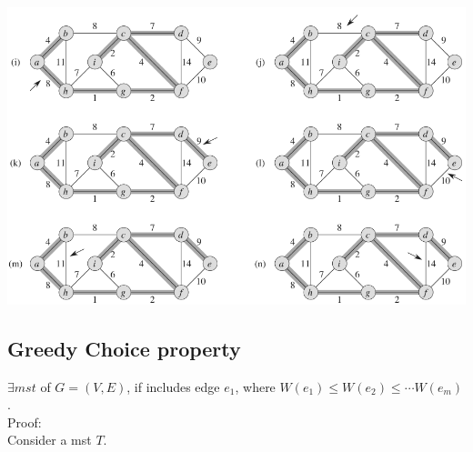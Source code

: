 \documentclass[a4paper]{article}
\begin{document}
\includegraphics[width=\textwidth]{Kruskal2}
\subsection*{Greedy Choice property}
$\exists{mst}$ of $G=(V,E)$, if includes edge $e_1$, where $W(e_1)\leq W(e_2)\leq \cdots W(e_m)$.\\
Proof:\\
Consider a mst $T$. \\
\end{document}
